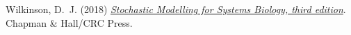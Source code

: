 \documentclass[mathserif,handout]{beamer}
\begin{document}
{\begin{thebibliography}{}

Wilkinson, D.~J. (2018)
 {\em \alert{\href{http://github.com/darrenjw/smfsb}{Stochastic Modelling for Systems Biology, third edition}}}.
 Chapman \& Hall/CRC Press.

\end{thebibliography}

\medskip






}
\end{document}
